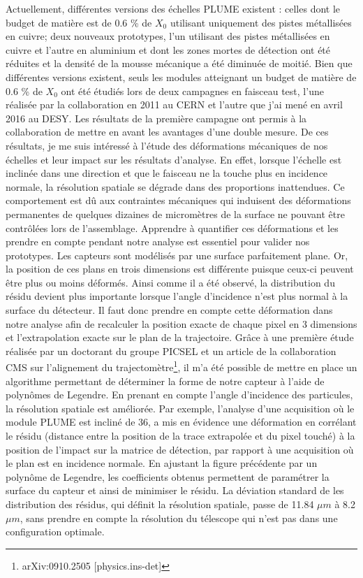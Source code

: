 \documentclass[a4papper, 10pt]{article}
\begin{document}
  Actuellement, différentes versions des échelles PLUME existent : celles dont le budget de matière est de 0.6 \% de $X_0$ utilisant uniquement des pistes métallisées en cuivre; deux nouveaux prototypes, l'un utilisant des pistes métallisées en cuivre et l'autre en aluminium et dont les zones mortes de détection ont été réduites et la densité de la mousse mécanique a été diminuée de moitié.
  Bien que différentes versions existent, seuls les modules atteignant un budget de matière de 0.6 \% de $X_0$ ont été étudiés lors de deux campagnes en faisceau test, l'une réalisée par la collaboration en 2011 au CERN et l'autre que j'ai mené en avril 2016 au DESY.
  Les résultats de la première campagne ont permis à la collaboration de mettre en avant les avantages d'une double mesure. 
  De ces résultats, je me suis intéressé à l'étude des déformations mécaniques de nos échelles et leur impact sur les résultats d'analyse.
  En effet, lorsque l'échelle est inclinée dans une direction et que le faisceau ne la touche plus en incidence normale, la résolution spatiale se dégrade dans des proportions inattendues.
  Ce comportement est dû aux contraintes mécaniques qui induisent des déformations permanentes de quelques dizaines de micromètres de la surface ne pouvant être contrôlées lors de l'assemblage.
  Apprendre à quantifier ces déformations et les prendre en compte pendant notre analyse est essentiel pour valider nos prototypes.
  Les capteurs sont modélisés par une surface parfaitement plane.
  Or, la position de ces plans en trois dimensions est différente puisque ceux-ci peuvent être plus ou moins déformés.
  Ainsi comme il a été observé, la distribution du résidu devient plus importante lorsque l'angle d'incidence n'est plus normal à la surface du détecteur.
  Il faut donc prendre en compte cette déformation dans notre analyse afin de recalculer la position exacte de chaque pixel en 3 dimensions et l'extrapolation exacte sur le plan de la trajectoire. 
  Grâce à une première étude réalisée par un doctorant du groupe PICSEL et un article de la collaboration CMS sur l'alignement du trajectomètre\footnote{arXiv:0910.2505 [physics.ins-det]}, il m'a été possible de mettre en place un algorithme permettant de déterminer la forme de notre capteur à l'aide de polynômes de Legendre. 
  En prenant en compte l'angle d'incidence des particules, la résolution spatiale est améliorée. 
  Par exemple, l'analyse d'une acquisition où le module PLUME est incliné de 36\degre, a mis en évidence une déformation en corrélant le résidu (distance entre la position de la trace extrapolée et du pixel touché) à la position de l'impact sur la matrice de détection, par rapport à une acquisition où le plan est en incidence normale.
  En ajustant la figure précédente par un polynôme de Legendre, les coefficients obtenus permettent de paramétrer la surface du capteur et ainsi de minimiser le résidu. 
  La déviation standard de les distribution des résidus, qui définit la résolution spatiale, passe de 11.84 $\mu m$ à 8.2 $\mu m$, sans prendre en compte la résolution du télescope qui n'est pas dans une configuration optimale.
\end{document}
